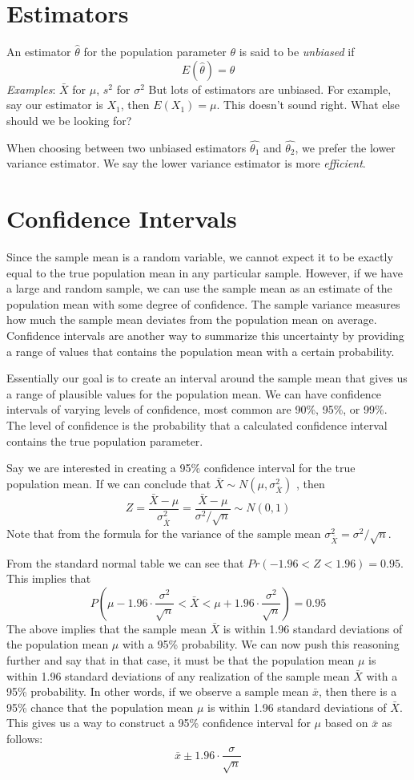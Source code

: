 \documentclass{./../../Latex/handout}
\begin{document}
\section{Estimators}
An estimator $\hat{\theta}$ for the population parameter $\theta$ is said to be \textit{unbiased} if 
$$ E(\hat{\theta}) = \theta $$
\textit{Examples}: $\bar{X}$ for $\mu$, $s^2$ for $\sigma^2$
But lots of estimators are unbiased. For example, say our estimator is $X_1$, then $E(X_1) = \mu$. This doesn't sound right. What else should we be looking for? 

When choosing between two unbiased estimators $\hat{\theta_1}$ and $\hat{\theta_2}$, we prefer the lower variance estimator. We say the lower variance estimator is more \textit{efficient}. 


\section{Confidence Intervals}

Since the sample mean is a random variable, we cannot expect it to be exactly equal to the true population mean in any particular sample. However, if we have a large and random sample, we can use the sample mean as an estimate of the population mean with some degree of confidence. The sample variance measures how much the sample mean deviates from the population mean on average. Confidence intervals are another way to summarize this uncertainty by providing a range of values that contains the population mean with a certain probability. 

Essentially our goal is to create an interval around the sample mean that gives us a
range of plausible values for the population mean. We can have confidence intervals of varying levels of confidence, most common are 90\%, 95\%, or 99\%. The level of confidence is the probability that a calculated confidence interval contains the true population parameter. 

Say we are interested in creating a 95\% confidence interval for the true population mean. If we can conclude that $\bar{X} \sim N(\mu, \sigma^2_{\bar{X}})$ , then
$$ Z = \frac{\bar{X}-\mu}{\sigma^2_{\bar{X}}} = \frac{\bar{X}-\mu}{\sigma^2/\sqrt{n}} \sim N(0,1)$$
Note that from the formula for the variance of the sample mean $\sigma^2_{\bar{X}}=\sigma^2/\sqrt{n}$. 

From the standard normal table we can see that $Pr(-1.96<Z<1.96)=0.95$. This implies that 
  $$ P\left(\mu-1.96 \cdot \frac{\sigma^2}{\sqrt{n}} < \bar{X} < \mu+1.96 \cdot \frac{\sigma^2}{\sqrt{n}} \right) = 0.95 $$
The above implies that the sample mean $\bar{X}$ is within 1.96 standard deviations of the population mean $\mu$ with a 95\% probability. We can now push this reasoning further and say that in that case, it must be that the population mean $\mu$ is within 1.96 standard deviations of any realization of the sample mean $\bar{X}$ with a 95\% probability. In other words, if we observe a sample mean $\bar{x}$, then there is a 95\% chance that the population mean $\mu$ is within 1.96 standard deviations of $\bar{X}$. This gives us a way to construct a 95\% confidence interval for $\mu$ based on $\bar{x}$ as follows:
 $$ \bar{x} \pm 1.96\cdot   \frac{\sigma}{\sqrt{n}} $$ 
 
\end{document}
